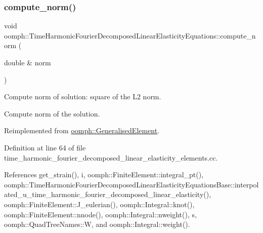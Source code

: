 \subsubsection{\texorpdfstring{compute\+\_\+norm()}{compute\_norm()}}
{\footnotesize\ttfamily void oomph\+::\+Time\+Harmonic\+Fourier\+Decomposed\+Linear\+Elasticity\+Equations\+::compute\+\_\+norm (\begin{DoxyParamCaption}\item[{double \&}]{norm }\end{DoxyParamCaption})\hspace{0.3cm}{\ttfamily [virtual]}}



Compute norm of solution\+: square of the L2 norm. 

Compute norm of the solution. 

Reimplemented from \hyperlink{classoomph_1_1GeneralisedElement_af2025a472df6752a946739da58e7fb37}{oomph\+::\+Generalised\+Element}.



Definition at line 64 of file time\+\_\+harmonic\+\_\+fourier\+\_\+decomposed\+\_\+linear\+\_\+elasticity\+\_\+elements.\+cc.



References get\+\_\+strain(), i, oomph\+::\+Finite\+Element\+::integral\+\_\+pt(), oomph\+::\+Time\+Harmonic\+Fourier\+Decomposed\+Linear\+Elasticity\+Equations\+Base\+::interpolated\+\_\+u\+\_\+time\+\_\+harmonic\+\_\+fourier\+\_\+decomposed\+\_\+linear\+\_\+elasticity(), oomph\+::\+Finite\+Element\+::\+J\+\_\+eulerian(), oomph\+::\+Integral\+::knot(), oomph\+::\+Finite\+Element\+::nnode(), oomph\+::\+Integral\+::nweight(), s, oomph\+::\+Quad\+Tree\+Names\+::W, and oomph\+::\+Integral\+::weight().

\mbox{\label{classoomph_1_1TimeHarmonicFourierDecomposedLinearElasticityEquations_ae5924f4e2937f652da983c47ea8f08d0}} 
